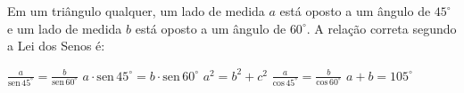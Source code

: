 Em um triângulo qualquer, um lado de medida $a$ está oposto a um ângulo de $45^\circ$ e um lado de medida $b$ está oposto a um ângulo de $60^\circ$. A relação correta segundo a Lei dos Senos é:

\parbox{\linewidth}{

$\frac{a}{\text{sen}\,45^\circ} = \frac{b}{\text{sen}\,60^\circ}$
$a \cdot \text{sen}\,45^\circ = b \cdot \text{sen}\,60^\circ$
$a^2 = b^2 + c^2$
$\frac{a}{\text{cos}\,45^\circ} = \frac{b}{\text{cos}\,60^\circ}$
$a+b = 105^\circ$

}



